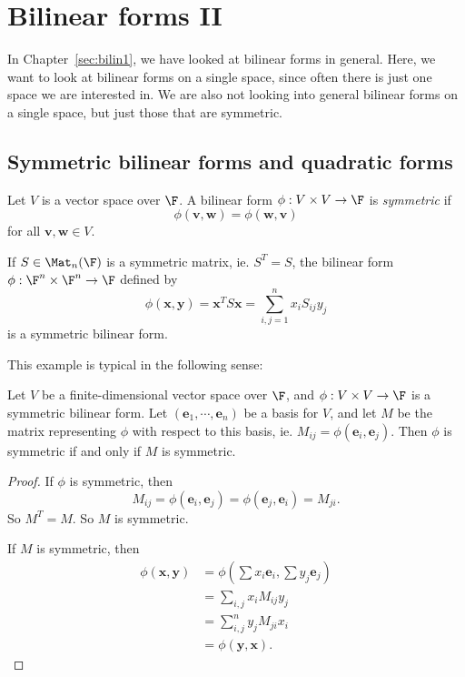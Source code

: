 \documentclass[a4paper]{article}
\begin{document}
\section{Bilinear forms II}
\label{sec:bilin2}
In Chapter~\ref{sec:bilin1}, we have looked at bilinear forms in general. Here, we want to look at bilinear forms on a single space, since often there is just one space we are interested in. We are also not looking into general bilinear forms on a single space, but just those that are symmetric.

\subsection{Symmetric bilinear forms and quadratic forms}
\begin{defi}
  Let $V$ is a vector space over $\F$. A bilinear form $\phi: V \times V \to \F$ is \emph{symmetric} if
  \[
    \phi(\mathbf{v}, \mathbf{w}) = \phi(\mathbf{w}, \mathbf{v})
  \]
  for all $\mathbf{v}, \mathbf{w} \in V$.
\end{defi}

\begin{eg}
  If $S \in \Mat_n(\F)$ is a symmetric matrix, ie. $S^T = S$, the bilinear form $\phi: \F^n \times \F^n \to \F$ defined by
  \[
    \phi(\mathbf{x}, \mathbf{y}) = \mathbf{x}^T S\mathbf{x} = \sum_{i, j = 1}^n x_i S_{ij} y_j
  \]
  is a symmetric bilinear form.
\end{eg}
This example is typical in the following sense:

\begin{lemma}
  Let $V$ be a finite-dimensional vector space over $\F$, and $\phi: V\times V \to \F$ is a symmetric bilinear form. Let $(\mathbf{e}_1, \cdots, \mathbf{e}_n)$ be a basis for $V$, and let $M$ be the matrix representing $\phi$ with respect to this basis, ie. $M_{ij} = \phi(\mathbf{e}_i, \mathbf{e}_j)$. Then $\phi$ is symmetric if and only if $M$ is symmetric.
\end{lemma}

\begin{proof}
  If $\phi$ is symmetric, then
  \[
    M_{ij} = \phi(\mathbf{e}_i, \mathbf{e}_j) = \phi(\mathbf{e}_j, \mathbf{e}_i) = M_{ji}.
  \]
  So $M^T = M$. So $M$ is symmetric.

  If $M$ is symmetric, then
  \begin{align*}
    \phi(\mathbf{x}, \mathbf{y}) &= \phi\left(\sum x_i \mathbf{e}_i, \sum y_j \mathbf{e}_j\right)\\
    &= \sum_{i, j} x_i M_{ij} y_j\\
    &= \sum_{i, j}^n y_j M_{ji} x_i\\
    &= \phi(\mathbf{y}, \mathbf{x}).
  \end{align*}
\end{proof}
\end{document}
